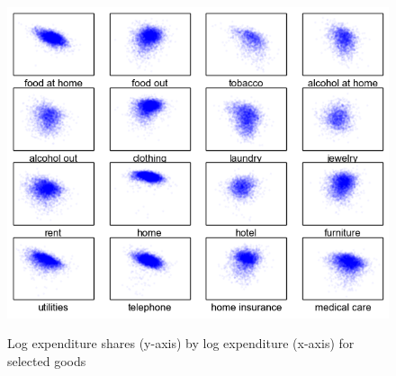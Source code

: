\begin{figure}
	\centering
		\includegraphics[scale=1]{pics/shr_plot.png}
	\label{fig:shr}
	\caption{Log expenditure shares (y-axis) by log expenditure (x-axis)
for selected goods}
\end{figure}

